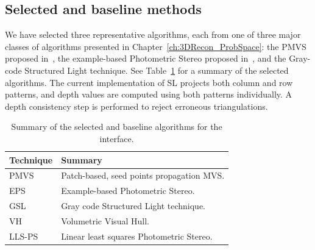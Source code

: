 \subsection{Selected and baseline methods}
We have selected three representative algorithms, each from one of three major classes of algorithms presented in Chapter~\ref{ch:3DRecon_ProbSpace}: the PMVS proposed in~\cite{furukawa2010accurate}, the example-based Photometric Stereo proposed in~\cite{hertzmann2005example}, and the Gray-code Structured Light technique. See Table~\ref{tab:selected_algos} for a summary of the selected algorithms. The current implementation of SL projects both column and row patterns, and depth values are computed using both patterns individually. A depth consistency step is performed to reject erroneous triangulations.
\begin{table}[!htbp]
\centering
\begin{tabular}{l|l}
\toprule
Technique & Summary\\
\midrule
PMVS & Patch-based, seed points propagation MVS.\\
EPS & Example-based Photometric Stereo.\\
GSL & Gray code Structured Light technique.\\
\midrule
VH & Volumetric Visual Hull.\\
LLS-PS & Linear least squares Photometric Stereo.\\
\bottomrule
\end{tabular}
\caption{Summary of the selected and baseline algorithms for the interface.}
\label{tab:selected_algos}
\end{table}

